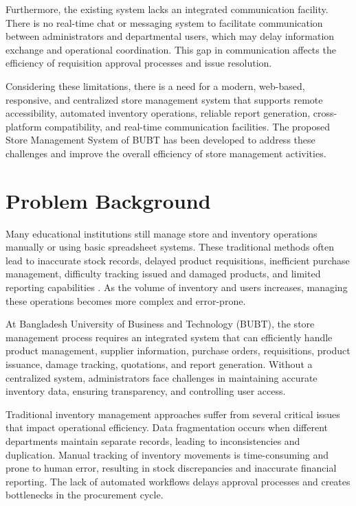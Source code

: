 Furthermore, the existing system lacks an integrated communication facility. There is no real-time chat or messaging system to facilitate communication between administrators and departmental users, which may delay information exchange and operational coordination. This gap in communication affects the efficiency of requisition approval processes and issue resolution.

Considering these limitations, there is a need for a modern, web-based, responsive, and centralized store management system that supports remote accessibility, automated inventory operations, reliable report generation, cross-platform compatibility, and real-time communication facilities. The proposed Store Management System of BUBT has been developed to address these challenges and improve the overall efficiency of store management activities.

\section{Problem Background}

Many educational institutions still manage store and inventory operations manually or using basic spreadsheet systems. These traditional methods often lead to inaccurate stock records, delayed product requisitions, inefficient purchase management, difficulty tracking issued and damaged products, and limited reporting capabilities \cite{fifo_inventory}. As the volume of inventory and users increases, managing these operations becomes more complex and error-prone.

At Bangladesh University of Business and Technology (BUBT), the store management process requires an integrated system that can efficiently handle product management, supplier information, purchase orders, requisitions, product issuance, damage tracking, quotations, and report generation. Without a centralized system, administrators face challenges in maintaining accurate inventory data, ensuring transparency, and controlling user access.

Traditional inventory management approaches suffer from several critical issues that impact operational efficiency. Data fragmentation occurs when different departments maintain separate records, leading to inconsistencies and duplication. Manual tracking of inventory movements is time-consuming and prone to human error, resulting in stock discrepancies and inaccurate financial reporting. The lack of automated workflows delays approval processes and creates bottlenecks in the procurement cycle.

